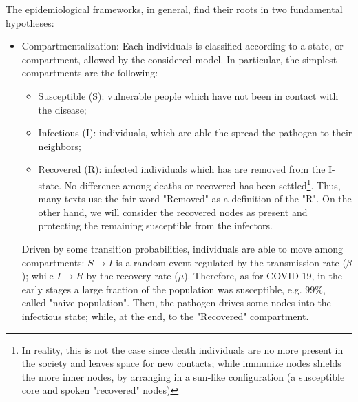 \documentclass[a4paper,10pt, oneside]{book} %
\theoremstyle{definition}
\begin{document}
The epidemiological frameworks, in general, find their roots in two fundamental hypotheses:
\begin{itemize}
	\item Compartmentalization: Each individuals is classified according to a state, or compartment, allowed by the considered model. In particular, the simplest compartments are the following:
	\begin{itemize}
		\item Susceptible (S): vulnerable people which have not been in contact with the disease;
		\item Infectious (I): individuals, which are able the spread the pathogen to their neighbors;
		\item Recovered (R): infected individuals which has are removed from the I-state. No difference among deaths or recovered has been settled\footnote{In reality, this is not the case since death individuals are no more present in the society and leaves space for new contacts; while immunize nodes shields the more inner nodes, by arranging in a sun-like configuration (a susceptible core and spoken "recovered" nodes)}. Thus, many texts use the fair word "Removed" as a definition of the "R". On the other hand, we will consider the recovered nodes as present and protecting the remaining susceptible from the infectors.
	\end{itemize}
	
	Driven by some transition probabilities, individuals are able to move among compartments: $S \rightarrow I$ is a random event regulated by the transmission rate ($\beta$); while $I \rightarrow R$ by the recovery rate ($\mu$). Therefore, as for COVID-19, in the early stages a large fraction of the population was susceptible, e.g. $99\%$, called "naive population". Then, the pathogen drives some nodes into the infectious state; while, at the end, to the "Recovered" compartment.


\end{itemize}
\end{document}
